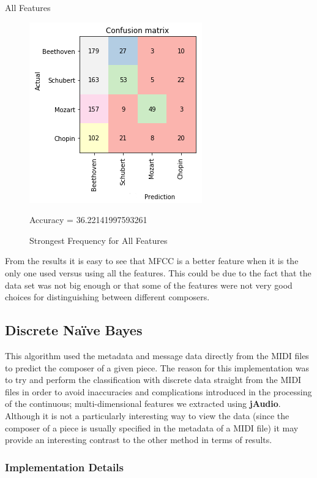 \documentclass[11pt]{article}
\makeatletter
\def\maxwidth{\ifdim\Gin@nat@width>\linewidth\linewidth
    \else\Gin@nat@width\fi}
\let\Oldincludegraphics\includegraphics
\renewcommand{\includegraphics}[1]{\Oldincludegraphics[width=.8\maxwidth]{#1}}
\makeatother
\begin{document}
All Features

\begin{figure}[h!]
\includegraphics{report/plots/NB_All.png} \caption{Strongest Frequency for All Features}
Accuracy = 36.22141997593261
\end{figure}


From the results it is easy to see that MFCC is a better feature when it
is the only one used versus using all the features. This could be due to
the fact that the data set was not big enough or that some of the
features were not very good choices for distinguishing between different
composers.

    \subsection{Discrete Naïve Bayes}\label{discrete-nauxefve-bayes}

This algorithm used the metadata and message data directly from the MIDI
files to predict the composer of a given piece. The reason for this
implementation was to try and perform the classification with discrete
data straight from the MIDI files in order to avoid inaccuracies and
complications introduced in the processing of the continuous;
multi-dimensional features we extracted using \textbf{jAudio}. Although
it is not a particularly interesting way to view the data (since the
composer of a piece is usually specified in the metadata of a MIDI file)
it may provide an interesting contrast to the other method in terms of
results.

\subsubsection{Implementation Details}\label{implementation-details}
\end{document}
